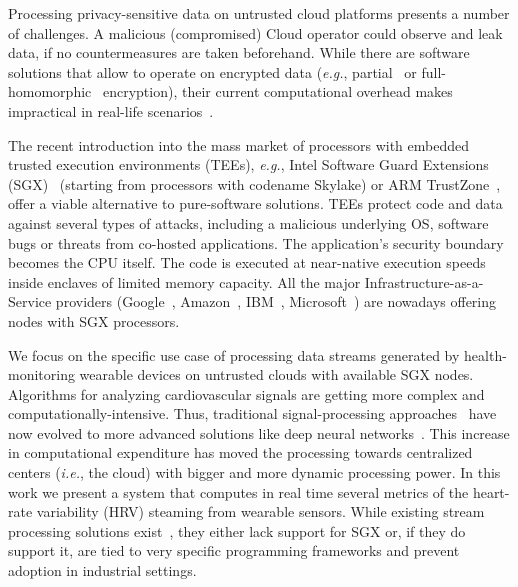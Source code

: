 Processing privacy-sensitive data on untrusted cloud platforms presents a number of challenges.
A malicious (compromised) Cloud operator could observe and leak data, if no countermeasures are taken beforehand.
While there are software solutions that allow to operate on encrypted data (\emph{e.g.}, partial~\cite{Paillier1999} or full-homomorphic~\cite{Gentry2012} encryption), their current computational overhead makes  impractical in real-life scenarios~\cite{Gottel2018S}.

The recent introduction into the mass market of processors with embedded trusted execution environments (TEEs), \emph{e.g.}, Intel Software Guard Extensions (SGX)~\cite{Costan2016} (starting from processors with codename Skylake) or ARM TrustZone~\cite{trustzone}, offer a viable alternative to pure-software solutions.
TEEs protect code and data against several types of attacks, including a malicious underlying OS, software bugs or threats from co-hosted applications.
The application's security boundary becomes the CPU itself.
The code is executed at near-native execution speeds inside enclaves of limited memory capacity.
All the major Infrastructure-as-a-Service providers (Google~\cite{gceskylake}, Amazon~\cite{amazonskylake}, IBM~\cite{ibm-sgx}, Microsoft~\cite{azureconfidential}) are nowadays offering nodes with SGX processors.

We focus on the specific use case of processing data streams generated by health-monitoring wearable devices on untrusted clouds with available SGX nodes.
Algorithms for analyzing cardiovascular signals are getting more complex and computationally-intensive.
Thus, traditional signal-processing approaches~\cite{Kumar2016} have now evolved to more advanced solutions like deep neural networks~\cite{Xiong2018,VanZaen2019}.
This increase in computational expenditure has moved the processing towards centralized centers (\textit{i.e.}, the cloud) with bigger and more dynamic processing power.%
In this work we present a system that computes in real time several metrics of the heart-rate variability (HRV) steaming from wearable sensors.
While existing stream processing solutions exist~\cite{spark-streaming-documentation,Havet2017}, they either lack support for SGX or, if they do support it, are tied to very specific programming frameworks and prevent adoption in industrial settings.

